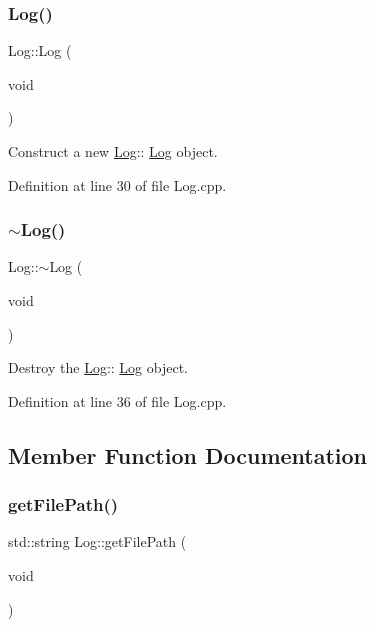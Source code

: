 \subsubsection{\texorpdfstring{Log()}{Log()}\hspace{0.1cm}{\footnotesize\ttfamily [2/2]}}
{\footnotesize\ttfamily Log\+::\+Log (\begin{DoxyParamCaption}\item[{void}]{ }\end{DoxyParamCaption})}



Construct a new \hyperlink{class_log}{Log}\+:\+: \hyperlink{class_log}{Log} object. 



Definition at line 30 of file Log.\+cpp.

\mbox{\label{class_log_ab047c1ac2053e451ff4b60c652e54353}} 
\subsubsection{\texorpdfstring{$\sim$\+Log()}{~Log()}}
{\footnotesize\ttfamily Log\+::$\sim$\+Log (\begin{DoxyParamCaption}\item[{void}]{ }\end{DoxyParamCaption})}



Destroy the \hyperlink{class_log}{Log}\+:\+: \hyperlink{class_log}{Log} object. 



Definition at line 36 of file Log.\+cpp.



\subsection{Member Function Documentation}
\mbox{\label{class_log_ad904745e682178df8405072499add3e2}} 
\subsubsection{\texorpdfstring{get\+File\+Path()}{getFilePath()}}
{\footnotesize\ttfamily std\+::string Log\+::get\+File\+Path (\begin{DoxyParamCaption}\item[{void}]{ }\end{DoxyParamCaption})}



